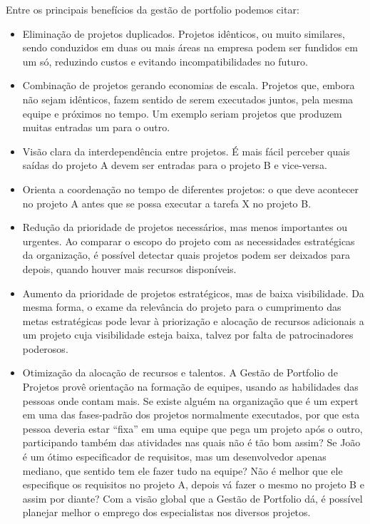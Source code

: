 \documentclass[12pt,a4paper,ruledheader,tocpage=prefix,floatnumber=continuous,pagestart=folhaderosto,font=times]{abnt}
\begin{document}
Entre os principais benefícios da gestão de portfolio podemos citar:\cite{atila}

\begin{itemize}
 \item Eliminação de projetos duplicados. Projetos idênticos, ou muito similares, sendo conduzidos em duas ou mais áreas na empresa podem ser fundidos em um só, reduzindo custos e evitando incompatibilidades no futuro.
 \item Combinação de projetos gerando economias de escala. Projetos que, embora não sejam idênticos, fazem sentido de serem executados juntos, pela mesma equipe e próximos no tempo. Um exemplo seriam projetos que produzem muitas entradas um para o outro.
 \item Visão clara da interdependência entre projetos. É mais fácil perceber quais saídas do projeto A devem ser entradas para o projeto B e vice-versa.
 \item Orienta a coordenação no tempo de diferentes projetos: o que deve acontecer no projeto A antes que se possa executar a tarefa X no projeto B.
 \item Redução da prioridade de projetos necessários, mas menos importantes ou urgentes. Ao comparar o escopo do projeto com as necessidades estratégicas da organização, é possível detectar quais projetos podem ser deixados para depois, quando houver mais recursos disponíveis.
 \item Aumento da prioridade de projetos estratégicos, mas de baixa visibilidade. Da mesma forma, o exame da relevância do projeto para o cumprimento das metas estratégicas pode levar à priorização e alocação de recursos adicionais a um projeto cuja visibilidade esteja baixa, 
talvez por falta de patrocinadores poderosos.
 \item Otimização da alocação de recursos e talentos. A Gestão de Portfolio de Projetos provê orientação na formação de equipes, usando as habilidades das pessoas onde contam mais. Se existe alguém na organização que é um expert em uma das fases-padrão dos projetos normalmente 
executados, por que esta pessoa deveria estar “fixa” em uma equipe que pega um projeto após o outro, participando também das atividades nas quais não é tão bom assim? Se João é um ótimo especificador de requisitos, mas um desenvolvedor apenas mediano, que sentido tem ele fazer 
tudo na equipe? Não é melhor que ele especifique os requisitos no projeto A, depois vá fazer o mesmo no projeto B e assim por diante? Com a visão global que a Gestão de Portfolio dá, é possível planejar melhor o emprego dos especialistas nos diversos projetos.

\end{itemize}
\end{document}
